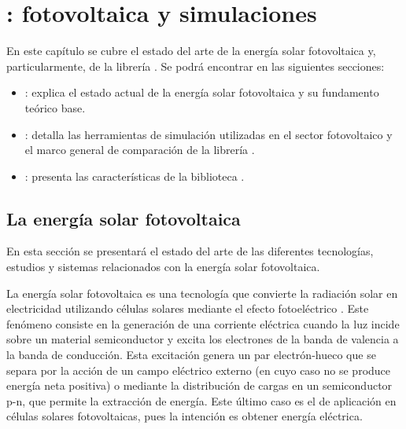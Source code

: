 \chapter{\pvlibpy{}: fotovoltaica y simulaciones} \label{chp:state-of-the-art}

En este capítulo se cubre el estado del arte de la energía solar \gls{fotovoltaica} y, particularmente, de la \gls{librería} \pvlibpy{}. Se podrá encontrar en las siguientes secciones:

\begin{itemize}

      \item {}: explica el estado actual de la energía solar \gls{fotovoltaica} y su fundamento teórico base.

      \item {}: detalla las herramientas de \gls{simulación} utilizadas en el sector fotovoltaico y el marco general de comparación de la librería \pvlibpy{}.

      \item {}: presenta las características de la biblioteca \pvlibpy{}.

\end{itemize}


\section{La energía solar fotovoltaica} \label{sct:energia-solar}

En esta sección se presentará el estado del arte de las diferentes tecnologías, estudios y sistemas relacionados con la energía solar fotovoltaica.

La energía solar \gls{fotovoltaica} es una tecnología que convierte la \gls{radiación solar} en electricidad utilizando células solares mediante el \gls{efecto fotoeléctrico} \cite[][pp. 701-706]{böer2002survey}.
Este fenómeno consiste en la generación de una corriente eléctrica cuando la luz incide sobre un material \gls{semiconductor} y excita los electrones de la \gls{banda de valencia} a la \gls{banda de conducción}. Esta excitación genera un \gls{par electrón-hueco} que se separa por la acción de un campo eléctrico externo (en cuyo caso no se produce energía neta positiva) o mediante la distribución de cargas en un \gls{semiconductor} p-n, que permite la extracción de energía. Este último caso es el de aplicación en células solares fotovoltaicas, pues la intención es obtener energía eléctrica.


